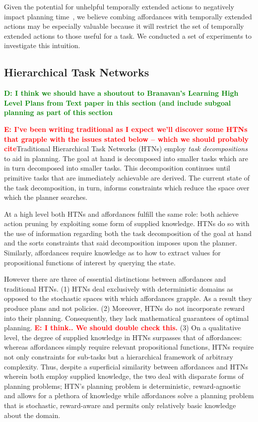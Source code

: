 \documentclass[conference]{IEEEtran}
\newcommand{\dnote}[1]{\textcolor{Green}{\textbf{D: #1}}}
\newcommand{\enote}[1]{\textcolor{Red}{\textbf{E: #1}}}
\begin{document}
Given the potential for unhelpful temporally extended actions to negatively impact planning time~\cite{Jong:2008zr}, we believe combing affordances with temporally extended actions
may be especially valuable because it will restrict the set of temporally extended actions to those
useful for a task. We conducted a set of experiments to investigate this intuition.

\subsection{Hierarchical Task Networks}

\dnote{I think we should have a shoutout to Branavan's Learning High Level Plans from Text paper in this section (and include subgoal planning as part of this section}

\enote{I've been writing traditional as I expect we'll discover some HTNs that grapple with the issues stated below -- which we should probably cite}Traditional Hierarchical Task Networks (HTNs) employ \textit{task decompositions} to aid in planning. The goal at hand is decomposed into smaller tasks which are in turn decomposed into smaller tasks. This decomposition continues until primitive tasks that are immediately achievable are derived. The current state of the task decomposition, in turn, informs constraints which reduce the space over which the planner searches.

At a high level both HTNs and affordances fulfill the same role: both achieve action pruning by exploiting some form of supplied knowledge. HTNs do so with the use of information regarding both the task decomposition of the goal at hand and the sorts constraints that said decomposition imposes upon the planner. Similarly, affordances require knowledge as to how to extract values for propositional functions of interest by querying the state.

However there are three of essential distinctions between affordances and traditional HTNs. (1) HTNs deal exclusively with deterministic domains as opposed to the stochastic spaces with which affordances grapple. As a result they produce plans and not policies. (2) Moreover, HTNs do not incorporate reward into their planning. Consequently, they lack mathematical guarantees of optimal planning. \enote{I think.. We should double check this.} (3) On a qualitative level, the degree of supplied knowledge in HTNs surpasses that of affordances: whereas affordances simply require relevant propositional functions, HTNs require not only constraints for sub-tasks but a hierarchical framework of arbitrary complexity. Thus, despite a superficial similarity between affordances and HTNs wherein both employ supplied knowledge, the two deal with disparate forms of planning problems; HTN's planning problem is deterministic, reward-agnostic and allows for a plethora of knowledge while affordances solve a planning problem that is stochastic, reward-aware and permits only relatively basic knowledge about the domain.
\end{document}
